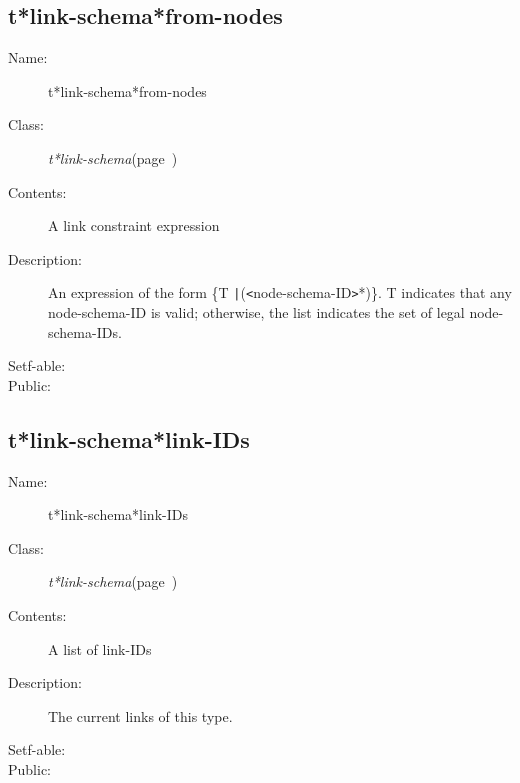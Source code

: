 \subsection{t*link-schema*from-nodes}
\label{t*link-schema*from-nodes}

\begin{description}
\item [Name:]  t*link-schema*from-nodes

\item [Class:] {\sl t*link-schema}\hfill(page~\pageref{t*link-schema})

\item [Contents:] A link constraint expression

\item [Description:]

An expression of the form \{T {\tt|}({\tt<}node-schema-ID{\tt>}*)\}.
T indicates that any node-schema-ID is valid; otherwise,
the list indicates the set of legal node-schema-IDs.

\item [Setf-able:]


\item [Public:]



\end{description}
\horizontalline

\subsection{t*link-schema*link-IDs}
\label{t*link-schema*link-IDs}

\begin{description}
\item [Name:]  t*link-schema*link-IDs

\item [Class:] {\sl t*link-schema}\hfill(page~\pageref{t*link-schema})

\item [Contents:] A list of link-IDs

\item [Description:]

The current links of this type.

\item [Setf-able:]


\item [Public:]



\end{description}
\horizontalline

